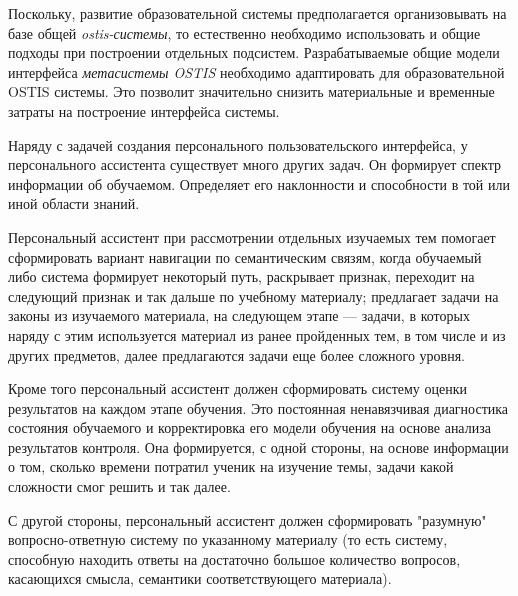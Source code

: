 Поскольку, развитие образовательной системы предполагается организовывать на базе
общей \textit{ostis-системы}, то естественно необходимо использовать и общие подходы при построении отдельных подсистем. Разрабатываемые общие модели интерфейса \textit{метасистемы OSTIS} необходимо адаптировать для образовательной OSTIS системы. Это позволит значительно снизить материальные и временные затраты на построение интерфейса системы.

Наряду с задачей создания персонального пользовательского интерфейса, у персонального ассистента существует много других задач. Он формирует спектр информации об обучаемом. Определяет его наклонности и способности в той или иной области знаний.

Персональный ассистент при рассмотрении отдельных изучаемых тем помогает сформировать вариант навигации по семантическим связям, когда обучаемый либо система формирует некоторый путь, раскрывает признак, переходит на следующий признак и так дальше по учебному материалу; предлагает задачи на законы из изучаемого материала, на следующем этапе --- задачи, в которых наряду с этим используется материал из ранее пройденных тем, в том числе и из других предметов, далее предлагаются задачи еще более сложного уровня. 

Кроме того персональный ассистент должен сформировать систему оценки результатов на каждом этапе обучения. Это постоянная ненавязчивая диагностика состояния обучаемого и корректировка его модели обучения на основе анализа результатов контроля. Она формируется, с одной стороны, на основе информации о том, сколько времени потратил ученик на изучение темы, задачи какой сложности смог решить и так далее.

С другой стороны, персональный ассистент должен сформировать "разумную"{} вопросно-ответную систему по указанному материалу (то есть систему, способную находить ответы на достаточно большое количество вопросов, касающихся смысла, семантики соответствующего материала).


